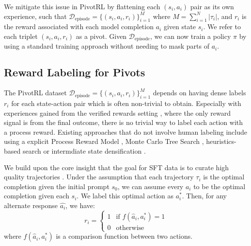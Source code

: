 We mitigate this issue in PivotRL by flattening each $(s_i, a_i)$ pair as its own experience, such that $\mathcal{D}_{\text{episode}} = \{ (s_i, a_i, r_i) \}_{i=1}^M$ where $M = \sum_{i=1}^N |\tau_i|$, and $r_i$ is the reward associated with each model completion $a_i$ given state $s_i$. We refer to each triplet $(s_i, a_i, r_i)$ as a pivot. Given $\mathcal{D}_{\text{episode}}$, we can now train a policy $\pi$ by using a standard training approach without needing to mask parts of $a_i$.

\subsection{Reward Labeling for Pivots}
The PivotRL dataset $\mathcal{D}_{\text{episode}} = \{ (s_i, a_i, r_i) \}_{i=1}^M$ depends on having dense labels $r_i$ for each state-action pair which is often non-trivial to obtain. Especially with experiences gained from the verified rewards setting \citep{shao2024deepseekmath,lambert2025tulu3pushingfrontiers,pyatkin2025generalizingverifiableinstructionfollowing}, where the only reward signal is from the final outcome, there is no trivial way to label each action with a process reward. Existing approaches that do not involve human labeling include using a explicit Process Reward Model \citep{lightman2023letsverifystepstep}, Monte Carlo Tree Search \citep{xin2024deepseekproverv15harnessingproofassistant,luo2024improvemathematicalreasoninglanguage}, heuristics-based search \citep{dong2025agenticreinforcedpolicyoptimization} or intermdiate state densification \citep{luo2025agentlightningtrainai} .

We build upon the core insight that the goal for SFT data is to curate high quality trajectories \citep{zhou2023limaalignment}. Under the assumption that each trajectory $\tau_i$ is the optimal completion given the initial prompt $s_0$, we can assume every $a_i$ to be the optimal completion given each $s_i$. We label this optimal action as $a_i^*$. Then, for any alternate response $\hat{a_i}$, we have:
\begin{equation}
    r_i = \begin{cases} 
        1 & \text{if } f(\hat{a}_i, a_i^*) = 1 \\
        0 & \text{otherwise}
    \end{cases}
\end{equation}
where $f(\hat{a}_i, a_i^*)$ is a comparison function between two actions.

